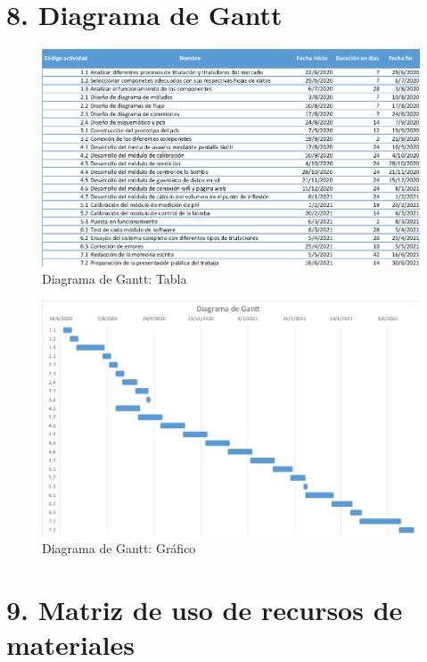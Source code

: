 \documentclass[11pt]{charter}
\begin{document}
\section{8. Diagrama de Gantt}
\label{sec:gantt}

\begin{figure}[htpb]
\centering 
\includegraphics[width=1\textwidth]{./Figuras/TablaGantt.png}
\caption{Diagrama de Gantt: Tabla}
\label{fig:tablaGantt}
\end{figure}

\begin{figure}[htpb]

\centering 
\includegraphics[width=1\textwidth]{./Figuras/DiagramaGantt.png}
\caption{Diagrama de Gantt: Gráfico}
\label{fig:diagramaGantt}
\end{figure}

\section{9. Matriz de uso de recursos de materiales}
\label{sec:recursos}
\end{document}
